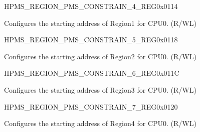 \begin{register}{H}{PMS\_REGION\_PMS\_CONSTRAIN\_4\_REG}{0x0114}\label{regdesc:PMSREGIONPMSCONSTRAIN4REG}
%
%
\regnewline%
\begin{regdesc}\begin{reglist}
\label{fielddesc:PMSREGIONPMSCONSTRAINADDR1}\item [PMS\_REGION\_PMS\_CONSTRAIN\_ADDR\_1] Configures the starting address of Region1 for CPU0. (R/WL)
\end{reglist}\end{regdesc}
\end{register}


\begin{register}{H}{PMS\_REGION\_PMS\_CONSTRAIN\_5\_REG}{0x0118}\label{regdesc:PMSREGIONPMSCONSTRAIN5REG}
%
%
\regnewline%
\begin{regdesc}\begin{reglist}
\label{fielddesc:PMSREGIONPMSCONSTRAINADDR2}\item [PMS\_REGION\_PMS\_CONSTRAIN\_ADDR\_2] Configures the starting address of Region2 for CPU0. (R/WL)
\end{reglist}\end{regdesc}
\end{register}


\begin{register}{H}{PMS\_REGION\_PMS\_CONSTRAIN\_6\_REG}{0x011C}\label{regdesc:PMSREGIONPMSCONSTRAIN6REG}
%
%
\regnewline%
\begin{regdesc}\begin{reglist}
\label{fielddesc:PMSREGIONPMSCONSTRAINADDR3}\item [PMS\_REGION\_PMS\_CONSTRAIN\_ADDR\_3] Configures the starting address of Region3 for CPU0. (R/WL)
\end{reglist}\end{regdesc}
\end{register}


\begin{register}{H}{PMS\_REGION\_PMS\_CONSTRAIN\_7\_REG}{0x0120}\label{regdesc:PMSREGIONPMSCONSTRAIN7REG}
%
%
\regnewline%
\begin{regdesc}\begin{reglist}
\label{fielddesc:PMSREGIONPMSCONSTRAINADDR4}\item [PMS\_REGION\_PMS\_CONSTRAIN\_ADDR\_4] Configures the starting address of Region4 for CPU0. (R/WL)
\end{reglist}\end{regdesc}
\end{register}


